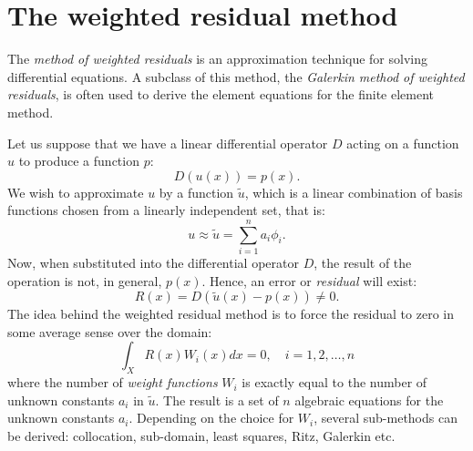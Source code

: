 \chapter{The weighted residual method}
\label{appendix1}

The \emph{method of weighted residuals} is an approximation technique for solving differential equations. A subclass of this method, the \emph{Galerkin method of weighted residuals}, is often used to derive the element equations for the finite element method. 

Let us suppose that we have a linear differential operator $ D $ acting on a function $ u $ to produce a function $ p $:
\begin{equation}
D(u(x)) = p(x).
\end{equation}
We wish to approximate $ u $ by a function $ \tilde{u} $, which is a linear combination of basis functions chosen from a linearly independent set, that is: 
\begin{equation}
u \approx \tilde{u} = \sum_{i=1}^n a_i \phi_i .
\end{equation}
Now, when substituted into the differential operator $ D $, the result of the operation is not, in general, $ p(x) $. Hence, an error or \emph{residual} will exist:
\begin{equation}
R(x) = D(\tilde{u}(x)-p(x)) \neq 0.
\end{equation}
The idea behind the weighted residual method is to force the residual to zero in some average sense over the domain:
\begin{equation}
\int_X R(x) W_i(x) dx = 0, \quad i = 1, 2, \ldots, n
\end{equation}
where the number of \emph{weight functions} $ W_i $ is exactly equal to the number of unknown constants $ a_i $ in $ \tilde{u} $. The result is a set of $ n $ algebraic equations for the unknown constants $ a_i $. Depending on the choice for $ W_i $, several sub-methods can be derived: collocation, sub-domain, least squares, Ritz, Galerkin etc. 

